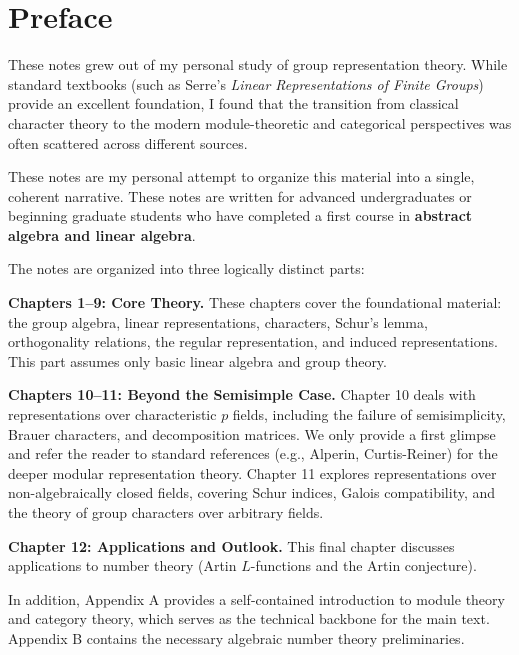 
\chapter*{Preface}

These notes grew out of my personal study of group representation theory. 
While standard textbooks (such as Serre's \emph{Linear Representations of Finite Groups}) 
provide an excellent foundation, I found that the transition from classical character theory 
to the modern module-theoretic and categorical perspectives was often scattered across 
different sources. 

\vspace{1em}
These notes are my personal attempt to organize this material into a single, 
coherent narrative. These notes are written for advanced undergraduates or beginning graduate students who have completed a first course in \textbf{abstract algebra and linear algebra}.

\vspace{1em}
The notes are organized into three logically distinct parts:

\noindent
\textbf{Chapters 1--9: Core Theory.} 
    These chapters cover the foundational material: the group algebra, linear representations, characters, Schur's lemma, orthogonality relations, the regular representation, and induced representations. This part assumes only basic linear algebra and group theory.

\noindent
\textbf{Chapters 10--11: Beyond the Semisimple Case.} 
    Chapter 10 deals with representations over characteristic $p$ fields, including the failure of semisimplicity, Brauer characters, and decomposition matrices. We only provide a first 
    glimpse and refer the reader to standard references (e.g., Alperin, 
    Curtis-Reiner) for the deeper modular representation theory. Chapter 11 explores representations over non-algebraically closed fields, covering Schur indices, Galois compatibility, and the theory of group characters over arbitrary fields.

\noindent
\textbf{Chapter 12: Applications and Outlook.} 
    This final chapter discusses applications to number theory (Artin $L$-functions and the Artin conjecture). 


In addition, Appendix A provides a self-contained introduction to module theory and category theory, which serves as the technical backbone for the main text. Appendix B contains the necessary algebraic number theory preliminaries.

